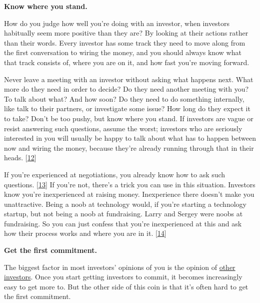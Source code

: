                     \textbf{Know where you stand.}

How do you judge how
                    well you're doing with an investor, when investors
                    habitually seem more positive than they are? By looking at
                    their actions rather than their words. Every investor has
                    some track they need to move along from the first
                    conversation to wiring the money, and you should always know
                    what that track consists of, where you are on it, and how
                    fast you're moving forward.

Never leave a meeting
                    with an investor without asking what happens next. What more
                    do they need in order to decide? Do they need another
                    meeting with you? To talk about what? And how soon? Do they
                    need to do something internally, like talk to their
                    partners, or investigate some issue? How long do they expect
                    it to take? Don't be too pushy, but know where you stand. If
                    investors are vague or resist answering such questions,
                    assume the worst; investors who are seriously interested in
                    you will usually be happy to talk about what has to happen
                    between now and wiring the money, because they're already
                    running through that in their heads.
                    [\href{\#f12n}{12}]

If you're experienced at negotiations, you
                    already know how to ask such questions.
                    [\href{\#f13n}{13}]
                    If you're not, there's a trick you can use in this
                    situation. Investors know you're inexperienced at raising
                    money. Inexperience there doesn't make you unattractive.
                    Being a noob at technology would, if you're starting a
                    technology startup, but not being a noob at fundraising.
                    Larry and Sergey were noobs at fundraising. So you can just
                    confess that you're inexperienced at this and ask how their
                    process works and where you are in it.
                    [\href{\#f14n}{14}]


                    \textbf{Get the first commitment.}

The biggest
                    factor in most investors' opinions of you is the opinion of
                    \href{http://www.paulgraham.com/herd.html}{other investors}. Once you start
                    getting investors to commit, it becomes increasingly easy to
                    get more to. But the other side of this coin is that it's
                    often hard to get the first commitment.

